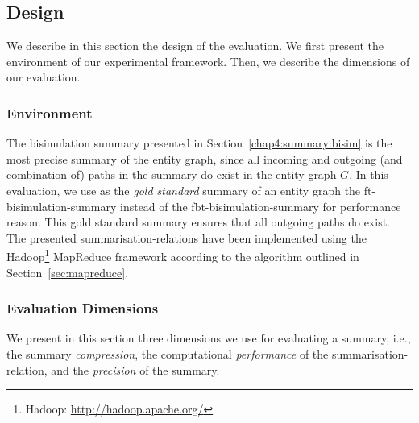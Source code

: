 \subsection{Design}
\label{sec:eval:design}

We describe in this section the design of the evaluation. We first present the environment of our experimental framework. Then, we describe the dimensions of our evaluation.

\subsubsection{Environment}

The bisimulation summary  presented in Section~\ref{chap4:summary:bisim} is the most precise summary of the entity graph, since all incoming and outgoing (and combination of) paths in the summary do exist in the entity graph $G$. In this evaluation, we use as the \emph{gold standard} summary of an entity graph the \gls{ft-bisimulation-summary} instead of the \gls{fbt-bisimulation-summary} for performance reason. This gold standard summary ensures that all outgoing paths do exist. The presented \glspl{summarisation-relation} have been implemented using the Hadoop\footnote{Hadoop: \url{http://hadoop.apache.org/}} MapReduce framework according to the algorithm outlined in Section~\ref{sec:mapreduce}.

\subsubsection{Evaluation Dimensions}

We present in this section three dimensions we use for evaluating a summary, i.e., the summary \emph{compression}, the computational \emph{performance} of the \gls{summarisation-relation}, and the \emph{precision} of the summary.

